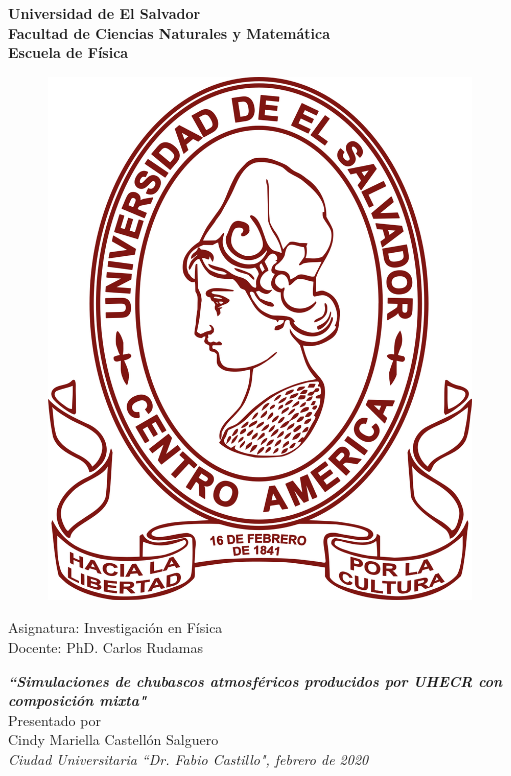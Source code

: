 \begin{titlepage}
	\begin{center}
	\LARGE
	\textbf{Universidad de El Salvador \\ 
	Facultad de Ciencias Naturales y Matemática  \\
	Escuela de Física}
	\end{center}
	
	\vspace{0.5cm}

	\begin{figure}[h]
	\centering
	\includegraphics[scale=0.12]{ues_logo.png}
	\end{figure}

	\vspace{0.5cm}
	
	\begin{center}
	\large	
	Asignatura: Investigación en Física \\
	Docente: PhD. Carlos Rudamas \\
	\vspace{1.0cm}
	
	\LARGE
	\textit{\textbf{``Simulaciones de chubascos atmosféricos producidos por UHECR con composición mixta"}}\\
	
	\vspace{1.0cm}
	\large
	Presentado por\\
	Cindy Mariella Castellón Salguero\\
	\vspace{5.0cm}
	\textit{Ciudad Universitaria ``Dr. Fabio Castillo", febrero de 2020}
	\end{center}
\end{titlepage}